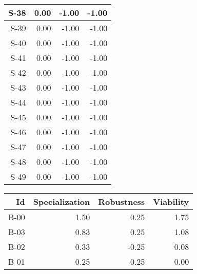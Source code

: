 \begin{tabular}{ | r | r | r | r | }
    \hline
                  S-38  &            0.00  &           -1.00  &           -1.00  \\
    \hline
                  S-39  &            0.00  &           -1.00  &           -1.00  \\
    \hline
                  S-40  &            0.00  &           -1.00  &           -1.00  \\
    \hline
                  S-41  &            0.00  &           -1.00  &           -1.00  \\
    \hline
                  S-42  &            0.00  &           -1.00  &           -1.00  \\
    \hline
                  S-43  &            0.00  &           -1.00  &           -1.00  \\
    \hline
                  S-44  &            0.00  &           -1.00  &           -1.00  \\
    \hline
                  S-45  &            0.00  &           -1.00  &           -1.00  \\
    \hline
                  S-46  &            0.00  &           -1.00  &           -1.00  \\
    \hline
                  S-47  &            0.00  &           -1.00  &           -1.00  \\
    \hline
                  S-48  &            0.00  &           -1.00  &           -1.00  \\
    \hline
                  S-49  &            0.00  &           -1.00  &           -1.00  \\
    \hline
\end{tabular}


\begin{tabular}{ | r | r | r | r | }
    \hline
                    Id  &  Specialization  &      Robustness  &       Viability  \\
    \hline
    \hline
                  B-00  &            1.50  &            0.25  &            1.75  \\
    \hline
                  B-03  &            0.83  &            0.25  &            1.08  \\
    \hline
                  B-02  &            0.33  &           -0.25  &            0.08  \\
    \hline
                  B-01  &            0.25  &           -0.25  &            0.00  \\
    \hline
\end{tabular}


